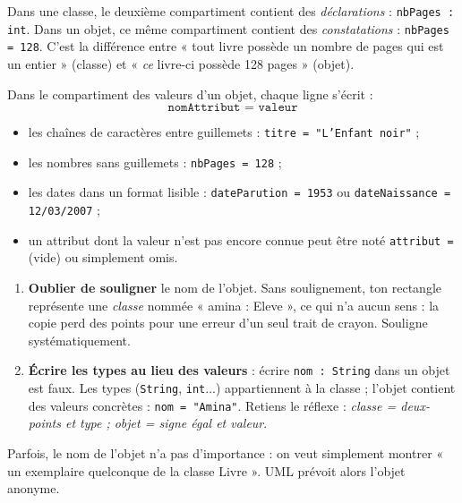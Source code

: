 \documentclass[11pt]{article}
\newcommand{\cle}[1]{{\popxbold\color{popdark}#1}}
\newcounter{popsec}
\newcounter{popsub}
\newcommand{\courssub}[1]{%
  \stepcounter{popsub}%
  \par\vspace{9pt}\noindent{\popxbold\fontsize{11.5}{13}\selectfont\color{popink}{\color{poporange}\thepopsec.\thepopsub}\hspace{6pt}#1}\par\nopagebreak\vspace{4pt}
}
\begin{document}
Dans une classe, le deuxième compartiment contient des \emph{déclarations} : \texttt{nbPages : int}. Dans un objet, ce même compartiment contient des \emph{constatations} : \texttt{nbPages = 128}. C'est la différence entre « tout livre possède un nombre de pages qui est un entier » (classe) et « \emph{ce} livre-ci possède 128 pages » (objet).

\begin{propriete}
Dans le compartiment des valeurs d'un objet, chaque ligne s'écrit :
\[ \texttt{nomAttribut = valeur} \]
\begin{itemize}
\item les chaînes de caractères entre guillemets : \texttt{titre = "L'Enfant noir"} ;
\item les nombres sans guillemets : \texttt{nbPages = 128} ;
\item les dates dans un format lisible : \texttt{dateParution = 1953} ou \texttt{dateNaissance = 12/03/2007} ;
\item un attribut dont la valeur n'est pas encore connue peut être noté \texttt{attribut = } (vide) ou simplement omis.
\end{itemize}
\end{propriete}

\begin{attention}
\begin{enumerate}
\item \textbf{Oublier de souligner} le nom de l'objet. Sans soulignement, ton rectangle représente une \emph{classe} nommée « amina : Eleve », ce qui n'a aucun sens : la copie perd des points pour une erreur d'un seul trait de crayon. Souligne systématiquement.
\item \textbf{Écrire les types au lieu des valeurs} : écrire \texttt{nom : String} dans un objet est faux. Les types (\texttt{String}, \texttt{int}...) appartiennent à la classe ; l'objet contient des valeurs concrètes : \texttt{nom = "Amina"}. Retiens le réflexe : \emph{classe = deux-points et type ; objet = signe égal et valeur}.
\end{enumerate}
\end{attention}

\courssub{Objet nommé et objet anonyme}

Parfois, le nom de l'objet n'a pas d'importance : on veut simplement montrer « un exemplaire quelconque de la classe Livre ». UML prévoit alors l'\cle{objet anonyme}.
\end{document}
